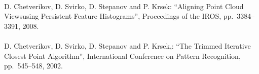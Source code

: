 \begin{mythebibliography}{}
\leavevmode \\D. Chetverikov, D. Svirko, D. Stepanov and P. Krsek:
\newblock ``Aligning Point Cloud Viewsusing Persistent Feature Histograms'',
\newblock Proceedings of the  IROS, pp.~3384--3391, 2008.
\\

\leavevmode \\D. Chetverikov, D. Svirko, D. Stepanov and P. Krsek,:
\newblock ``The Trimmed Iterative Closest Point Algorithm'',
\newblock  International  Conference  on Pattern Recognition, pp.~545--548, 2002.
\\




%

%
%


%
%
%
%


\end{mythebibliography}
